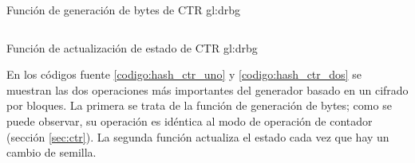 \begin{listing}
  \inputminted[firstline=82, lastline=101]
    {c++}{../implementaciones/drbg/ctr_drbg.cpp}
  \caption{Función de generación de bytes de CTR \gls{gl:drbg}}
  \label{codigo:hash_ctr_uno}
\end{listing}

\begin{listing}
  \inputminted[firstline=103, lastline=123]
    {c++}{../implementaciones/drbg/ctr_drbg.cpp}
  \caption{Función de actualización de estado de CTR \gls{gl:drbg}}
  \label{codigo:hash_ctr_dos}
\end{listing}

En los códigos fuente \ref{codigo:hash_ctr_uno} y \ref{codigo:hash_ctr_dos}
se muestran las dos operaciones más importantes del generador basado en un
cifrado por bloques. La primera se trata de la función de generación de bytes;
como se puede observar, su operación es idéntica al modo de operación de
contador (sección \ref{sec:ctr}). La segunda función actualiza el estado
cada vez que hay un cambio de semilla.

